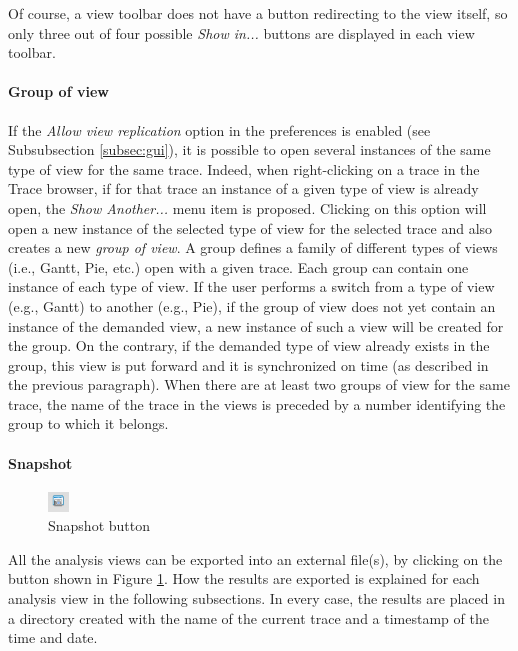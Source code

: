 \documentclass[twoside]{article}
\begin{document}
\begin{sloppypar}
Of course, a view toolbar does not have a button redirecting to the view itself, so only three out of four possible \emph{Show in...} buttons are displayed in each view toolbar.

\paragraph{Group of view}
If the \emph{Allow view replication} option in the preferences is enabled (see Subsubsection \ref{subsec:gui}), it is possible to open several instances of the same type of view for the same trace. 
Indeed, when right-clicking on a trace in the Trace browser, if for that trace an instance of a given type of view is already open, the \emph{Show Another...} menu item is proposed. 
Clicking on this option will open a new instance of the selected type of view for the selected trace and also creates a new \emph{group of view}. 
A group defines a family of different types of views (i.e., Gantt, Pie, etc.) open with a given trace.
Each group can contain one instance of each type of view.
If the user performs a switch from a type of view (e.g., Gantt) to another (e.g., Pie), if the group of view does not yet contain an instance of the demanded view, a new instance of such a view will be created for the group.
On the contrary, if the demanded type of view already exists in the group, this view is put forward and it is synchronized on time (as described in the previous paragraph).  
When there are at least two groups of view for the same trace, the name of the trace in the views is preceded by a number identifying the group to which it belongs.

\paragraph{Snapshot}
\begin{figure}[h!]
  \centering
    \includegraphics[width=0.05\textwidth]{images/snapshot_icon.png}
  \caption{Snapshot button}
  \label{fig:snapshot}
\end{figure}

All the analysis views can be exported into an external file(s), by clicking on the button shown in Figure \ref{fig:snapshot}.
How the results are exported is explained for each analysis view in the following subsections.
In every case, the results are placed in a directory created with the name of the current trace and a timestamp of the time and date.


\end{sloppypar}
\end{document}
